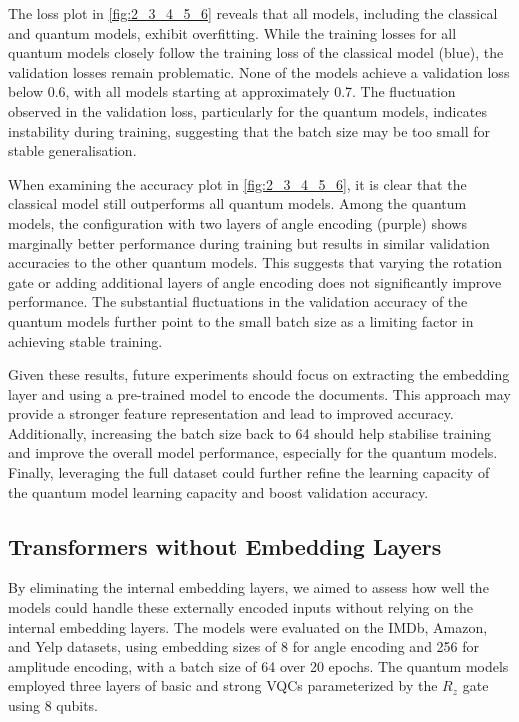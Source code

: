 The loss plot in \autoref{fig:2_3_4_5_6} reveals that all models,
including the classical and
quantum models, exhibit overfitting. While the training losses for
all quantum models closely follow the training
loss of the classical model (blue), the validation losses remain
problematic. None of the models
achieve a validation loss below 0.6, with all models starting at
approximately 0.7. The fluctuation observed in the validation loss,
particularly for the quantum models, indicates instability during
training, suggesting that the batch size may be too small for stable
generalisation.

When examining the accuracy plot in \autoref{fig:2_3_4_5_6}, it is
clear that the classical
model still outperforms all quantum models. Among the quantum models,
the configuration with two layers of angle encoding (purple) shows marginally
better performance during training but results in similar validation
accuracies to the other quantum models. This suggests that varying
the rotation gate or adding additional layers of angle encoding does
not significantly improve performance. The substantial fluctuations
in the validation accuracy of the quantum models further point to the
small batch size as a limiting factor in achieving stable training.

Given these results, future experiments should focus on extracting
the embedding layer and using a pre-trained model to encode the
documents. This approach may provide a stronger feature
representation and lead to improved accuracy. Additionally,
increasing the batch size back to 64 should help stabilise training
and improve the overall model performance, especially for the quantum
models. Finally, leveraging the full dataset could further refine the
learning capacity  of the quantum model learning capacity and boost
validation accuracy.

\subsection{Transformers without Embedding Layers}
\label{subsec:transformers_without_embedding_layers}
By eliminating the internal embedding layers, we aimed to assess how
well the models could handle these externally encoded inputs without
relying on the internal embedding layers. The models
were evaluated on the IMDb, Amazon, and Yelp datasets, using
embedding sizes of 8 for angle encoding and 256 for amplitude encoding,
with a batch size of 64 over 20 epochs.
The quantum models employed three layers of basic
and strong \glspl{VQC} parameterized by the \(R_z\) gate using 8 qubits.


